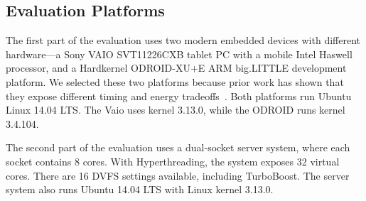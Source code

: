 \subsection{Evaluation Platforms}

The first part of the evaluation uses two modern embedded devices with different hardware---a Sony VAIO SVT11226CXB tablet PC with a mobile Intel Haswell processor, and a Hardkernel ODROID-XU+E ARM big.LITTLE development platform.
We selected these two platforms because prior work has shown that they expose different timing and energy tradeoffs~\cite{Imes2014}.
Both platforms run Ubuntu Linux 14.04 LTS.
The Vaio uses kernel 3.13.0, while the ODROID runs kernel 3.4.104.


The second part of the evaluation uses a dual-socket server system, where each socket contains 8 cores.
With Hyperthreading, the system exposes 32 virtual cores.
There are 16 DVFS settings available, including TurboBoost.
The server system also runs Ubuntu 14.04 LTS with Linux kernel 3.13.0.

